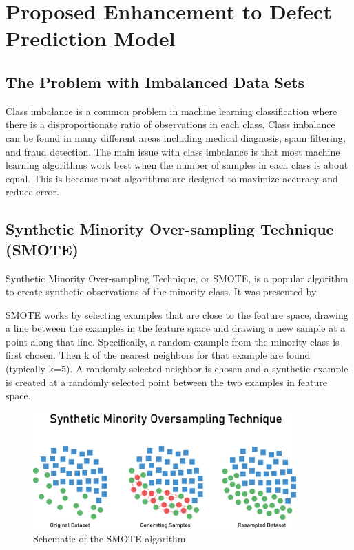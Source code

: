 \documentclass[12pt]{report}
\begin{document}
\chapter*{Proposed Enhancement to Defect Prediction Model}

\section*{The Problem with Imbalanced Data Sets}

Class imbalance is a common problem in machine learning classification where
there is a disproportionate ratio of observations in each class. Class
imbalance can be found in many different areas including medical diagnosis,
spam filtering, and fraud detection. The main issue with class imbalance is
that most machine learning algorithms work best when the number of samples in
each class is about equal. This is because most algorithms are designed to
maximize accuracy and reduce error.

\section*{Synthetic Minority Over-sampling Technique (SMOTE)}

Synthetic Minority Over-sampling Technique, or SMOTE, is a popular algorithm to
create synthetic observations of the minority class. It was presented
by\cite{chawla2002smote}.\newpage

SMOTE works by selecting examples that are close to the feature space, drawing
a line between the examples in the feature space and drawing a new sample at a
point along that line. Specifically, a random example from the minority class
is first chosen. Then k of the nearest neighbors for that example are found
(typically k=5). A randomly selected neighbor is chosen and a synthetic example
is created at a randomly selected point between the two examples in feature
space.

\begin{figure}[hbt!]
      \centering
      \includegraphics[width=0.9\textwidth]{./figures/smote.png}
      \caption{Schematic of the SMOTE algorithm.}
      \label{fig:SMOTE}
\end{figure}
\end{document}
